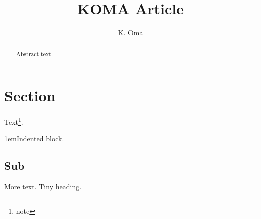 \documentclass[a4paper,11pt,parskip=half]{scrartcl}
\begin{document}
\title{KOMA Article}\author{K. Oma}\maketitle
\begin{abstract}Abstract text.\end{abstract}
\section{Section}Text\footnote{note}.
\begin{addmargin}[1em]{1em}Indented block.\end{addmargin}
\subsection{Sub}More text.
Tiny heading.
\end{document}
